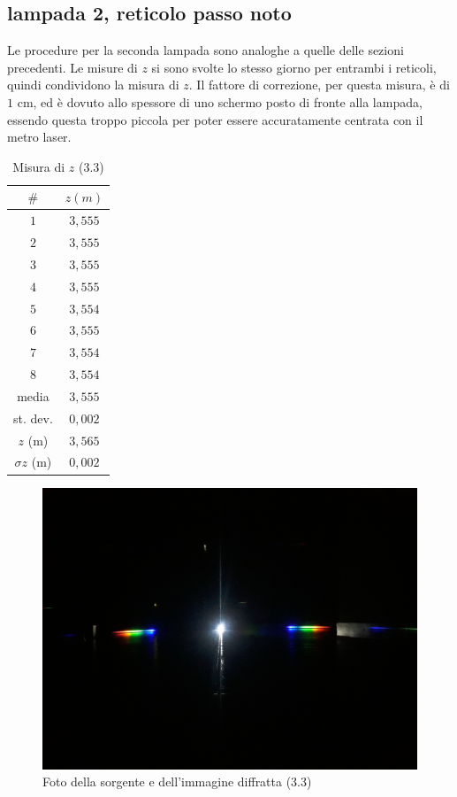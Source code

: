 \documentclass{article}
\begin{document}
\pagebreak

\subsection{lampada 2, reticolo passo noto}

Le procedure per la seconda lampada sono analoghe a quelle delle sezioni precedenti. Le misure di $z$ si sono svolte lo stesso giorno per entrambi i reticoli, quindi condividono la misura di $z$. Il fattore di correzione, per questa misura, è di $1$ cm, ed è dovuto allo spessore di uno schermo posto di fronte alla lampada, essendo questa troppo piccola per poter essere accuratamente centrata con il metro laser.

\begin{table}[h!]
\centering
\begin{tabular}{ | c | c | }
  \hline
  $\#$ & $z (m)$ \\
  \hline
  $1$ & $3,555$ \\
  $2$ & $3,555$ \\
  $3$ & $3,555$ \\
  $4$ & $3,555$ \\
  $5$ & $3,554$ \\
  $6$ & $3,555$ \\
  $7$ & $3,554$ \\
  $8$ & $3,554$ \\
  \hline 
  media & $3,555$ \\
  st. dev. & $0,002$ \\
  \hline
  $z$ (m) & $3,565$ \\
  $\sigma z$ (m) & $0,002$ \\
  \hline
\end{tabular}
\caption{Misura di $z$ (3.3)}
\end{table}

\begin{figure}[h!]
  \centering
  \includegraphics[width=0.6\linewidth]{IM 4.1}
  \caption{Foto della sorgente e dell'immagine diffratta (3.3)}
\end{figure}
\end{document}
